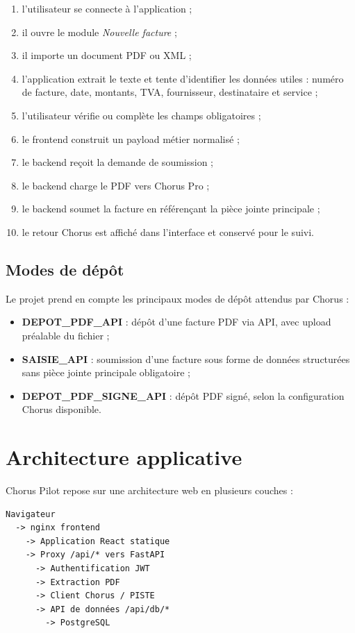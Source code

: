 \documentclass[11pt,a4paper]{article}
\begin{document}
\begin{enumerate}
  \item l'utilisateur se connecte à l'application ;
  \item il ouvre le module \textit{Nouvelle facture} ;
  \item il importe un document PDF ou XML ;
  \item l'application extrait le texte et tente d'identifier les données utiles :
        numéro de facture, date, montants, TVA, fournisseur, destinataire et service ;
  \item l'utilisateur vérifie ou complète les champs obligatoires ;
  \item le frontend construit un payload métier normalisé ;
  \item le backend reçoit la demande de soumission ;
  \item le backend charge le PDF vers Chorus Pro ;
  \item le backend soumet la facture en référençant la pièce jointe principale ;
  \item le retour Chorus est affiché dans l'interface et conservé pour le suivi.
\end{enumerate}

\subsection{Modes de dépôt}

Le projet prend en compte les principaux modes de dépôt attendus par Chorus :

\begin{itemize}
  \item \textbf{DEPOT\_PDF\_API} : dépôt d'une facture PDF via API, avec upload
        préalable du fichier ;
  \item \textbf{SAISIE\_API} : soumission d'une facture sous forme de données
        structurées sans pièce jointe principale obligatoire ;
  \item \textbf{DEPOT\_PDF\_SIGNE\_API} : dépôt PDF signé, selon la configuration
        Chorus disponible.
\end{itemize}

\section{Architecture applicative}

Chorus Pilot repose sur une architecture web en plusieurs couches :

\begin{lstlisting}
Navigateur
  -> nginx frontend
    -> Application React statique
    -> Proxy /api/* vers FastAPI
      -> Authentification JWT
      -> Extraction PDF
      -> Client Chorus / PISTE
      -> API de données /api/db/*
        -> PostgreSQL
\end{lstlisting}
\end{document}
